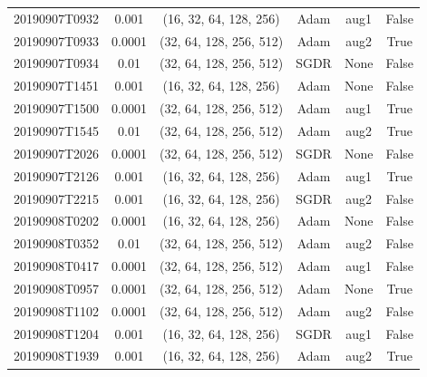 \begin{table}[!ht]
\begin{adjustbox}{width=\columnwidth, center}
\begin{tabular}{cccccc}
			20190907T0932 &        0.001 &   (16, 32, 64, 128, 256) &      Adam &                  aug1 &                  False \\
			20190907T0933 &       0.0001 &  (32, 64, 128, 256, 512) &      Adam &                  aug2 &                   True \\
			20190907T0934 &         0.01 &  (32, 64, 128, 256, 512) &      SGDR &                  None &                  False \\
			20190907T1451 &        0.001 &   (16, 32, 64, 128, 256) &      Adam &                  None &                  False \\
			20190907T1500 &       0.0001 &  (32, 64, 128, 256, 512) &      Adam &                  aug1 &                   True \\
			20190907T1545 &         0.01 &  (32, 64, 128, 256, 512) &      Adam &                  aug2 &                   True \\
			20190907T2026 &       0.0001 &  (32, 64, 128, 256, 512) &      SGDR &                  None &                  False \\
			20190907T2126 &        0.001 &   (16, 32, 64, 128, 256) &      Adam &                  aug1 &                   True \\
			20190907T2215 &        0.001 &   (16, 32, 64, 128, 256) &      SGDR &                  aug2 &                  False \\
			20190908T0202 &       0.0001 &   (16, 32, 64, 128, 256) &      Adam &                  None &                  False \\
			20190908T0352 &         0.01 &  (32, 64, 128, 256, 512) &      Adam &                  aug2 &                  False \\
			20190908T0417 &       0.0001 &  (32, 64, 128, 256, 512) &      Adam &                  aug1 &                  False \\
			20190908T0957 &       0.0001 &  (32, 64, 128, 256, 512) &      Adam &                  None &                   True \\
			20190908T1102 &       0.0001 &  (32, 64, 128, 256, 512) &      Adam &                  aug2 &                  False \\
			20190908T1204 &        0.001 &   (16, 32, 64, 128, 256) &      SGDR &                  aug1 &                  False \\
			20190908T1939 &        0.001 &   (16, 32, 64, 128, 256) &      Adam &                  aug2 &                   True \\

\end{tabular}
\end{adjustbox}
\end{table}
